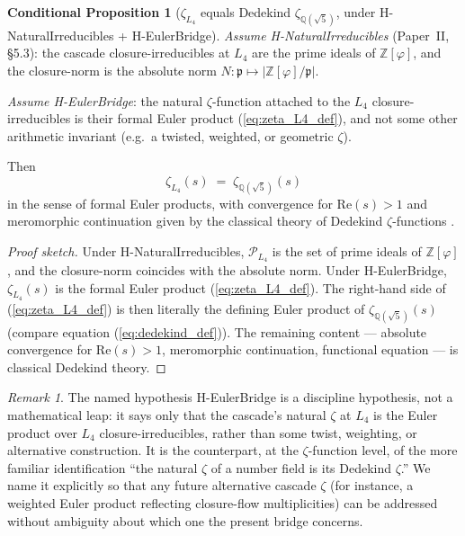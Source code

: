 \documentclass[11pt,a4paper]{article}
\theoremstyle{definition}
\newtheorem{conditional}[theorem]{Conditional Proposition}
\theoremstyle{remark}
\newtheorem{remark}[theorem]{Remark}
\begin{document}
\begin{conditional}[$\zeta_{L_4}$ equals Dedekind $\zeta_{\mathbb{Q}(\sqrt{5})}$, under H-NaturalIrreducibles + H-EulerBridge]\label{prop:l4_dedekind}
\emph{Assume H-NaturalIrreducibles} (Paper~II, \S 5.3): the cascade
closure-irreducibles at $L_4$ are the prime ideals of
$\mathbb{Z}[\varphi]$, and the closure-norm is the absolute norm
$N : \mathfrak{p} \mapsto |\mathbb{Z}[\varphi]/\mathfrak{p}|$.

\emph{Assume H-EulerBridge}: the natural $\zeta$-function attached to
the $L_4$ closure-irreducibles is their formal Euler product
(\ref{eq:zeta_L4_def}), and not some other arithmetic invariant (e.g.\
a twisted, weighted, or geometric $\zeta$).

\smallskip Then
\begin{equation}
  \zeta_{L_4}(s) \;=\; \zeta_{\mathbb{Q}(\sqrt{5})}(s)
\end{equation}
in the sense of formal Euler products, with convergence for
$\mathrm{Re}(s) > 1$ and meromorphic continuation given by the
classical theory of Dedekind $\zeta$-functions
\cite{Neukirch1999,Marcus1977}.
\end{conditional}

\begin{proof}[Proof sketch]
Under H-NaturalIrreducibles, $\mathcal{P}_{L_4}$ is the set of prime
ideals of $\mathbb{Z}[\varphi]$, and the closure-norm coincides with the
absolute norm. Under H-EulerBridge, $\zeta_{L_4}(s)$ is the formal
Euler product (\ref{eq:zeta_L4_def}). The right-hand side of
(\ref{eq:zeta_L4_def}) is then literally the defining Euler product of
$\zeta_{\mathbb{Q}(\sqrt{5})}(s)$ (compare equation
(\ref{eq:dedekind_def})). The remaining content --- absolute convergence
for $\mathrm{Re}(s) > 1$, meromorphic continuation, functional equation
--- is classical Dedekind theory.
\end{proof}

\begin{remark}
The named hypothesis H-EulerBridge is a discipline hypothesis, not a
mathematical leap: it says only that the cascade's natural $\zeta$ at
$L_4$ is the Euler product over $L_4$ closure-irreducibles, rather than
some twist, weighting, or alternative construction. It is the
counterpart, at the $\zeta$-function level, of the more familiar
identification ``the natural $\zeta$ of a number field is its Dedekind
$\zeta$.'' We name it explicitly so that any future alternative cascade
$\zeta$ (for instance, a weighted Euler product reflecting closure-flow
multiplicities) can be addressed without ambiguity about which one the
present bridge concerns.
\end{remark}
\end{document}
